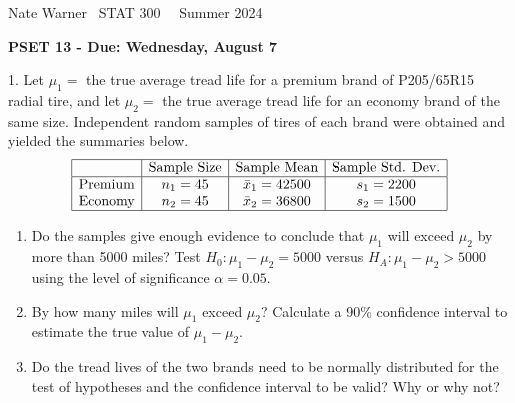 \documentclass{report}
\title{\Huge{}}
\author{\huge{Nathan Warner}}
\date{\huge{}}
\begin{document}
 \pagebreak \bigbreak \noindent
 Nate Warner \ \quad \quad \quad \quad \quad \quad \quad \quad \quad \quad \quad \quad  STAT 300 \quad  \quad \quad \quad \quad \quad \quad \quad \quad \ \ \quad Summer 2024
 \begin{center}
     \textbf{PSET 13 - Due: Wednesday, August 7}
 \end{center}
 \bigbreak \noindent 
 \begin{mdframed}
     1. Let $\mu_1 = $ the true average tread life for a premium brand of P205/65R15 radial tire, and let $\mu_2 = $ the true average tread life for an economy brand of the same size. Independent random samples of tires of each brand were obtained and yielded the summaries below.
     \[
         \begin{array}{|c|c|c|c|c|}
             \hline
& \text{Sample Size} & \text{Sample Mean} & \text{Sample Std. Dev.} \\
\hline
             \text{Premium} & n_1 = 45 & \bar{x}_1 = 42500 & s_1 = 2200 \\
             \text{Economy} & n_2 = 45 & \bar{x}_2 = 36800 & s_2 = 1500 \\
             \hline
         \end{array}
     \]
     \begin{enumerate}[label=(\alph*)]
         \item Do the samples give enough evidence to conclude that $\mu_1$ will exceed $\mu_2$ by more than 5000 miles? Test $H_0: \mu_1 - \mu_2 = 5000$ versus $H_A: \mu_1 - \mu_2 > 5000$ using the level of significance $\alpha = 0.05$.
         \item By how many miles will $\mu_1$ exceed $\mu_2$? Calculate a 90\% confidence interval to estimate the true value of $\mu_1 - \mu_2$.
         \item Do the tread lives of the two brands need to be normally distributed for the test of hypotheses and the confidence interval to be valid? Why or why not?
     \end{enumerate}
 \end{mdframed}
\end{document}
